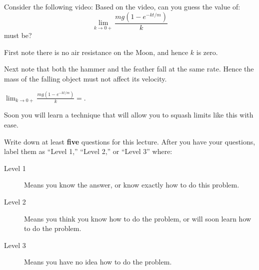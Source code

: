\documentclass{ximera}
\begin{document}



\begin{problem}
Consider the following video: 
Based on the video, can you guess the value of:
\[
\lim_{k\to 0+} \frac{mg(1-e^{-kt/m})}{k}
\]
must be?
\begin{hint}
First note there is no air resistance on the Moon, and hence $k$ is
zero.
\end{hint}
\begin{hint}
Next note that both the hammer and the feather fall at the same rate.
Hence the mass of the falling object must not affect its velocity.
\end{hint}
\begin{prompt}
$\lim_{k\to 0+}\frac{mg(1-e^{-kt/m})}{k} = $.
\end{prompt}
\end{problem}

Soon you will learn a technique that will allow you to squash limits
like this with ease.

\begin{xarmaBoost}
  Write down at least \textbf{five} questions for this lecture. After
  you have your questions, label them as ``Level 1,'' ``Level 2,'' or
  ``Level 3'' where:
\begin{description}
\item[Level 1] Means you know the answer, or know exactly how to do
  this problem.
\item[Level 2] Means you think you know how to do the problem, or will
  soon learn how to do the problem.
\item[Level 3] Means you have no idea how to do the problem.
\end{description}
\begin{freeResponse}
\end{freeResponse}
\end{xarmaBoost}
\end{document}
